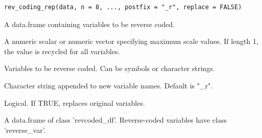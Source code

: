 \documentclass[a4paper]{book}
\begin{document}
%
\begin{Usage}
\begin{verbatim}
rev_coding_rep(data, n = 8, ..., postfix = "_r", replace = FALSE)
\end{verbatim}
\end{Usage}
%
\begin{Arguments}
\begin{ldescription}
\item[\code{data}] A data.frame containing variables to be reverse coded.

\item[\code{n}] A numeric scalar or numeric vector specifying maximum scale values.
If length 1, the value is recycled for all variables.

\item[\code{...}] Variables to be reverse coded. Can be symbols or character strings.

\item[\code{postfix}] Character string appended to new variable names.
Default is "\_r".

\item[\code{replace}] Logical. If TRUE, replaces original variables.
\end{ldescription}
\end{Arguments}
%
\begin{Value}
A data.frame of class 'revcoded\_df'.
Reverse-coded variables have class 'reverse\_var'.
\end{Value}
%
\end{document}
